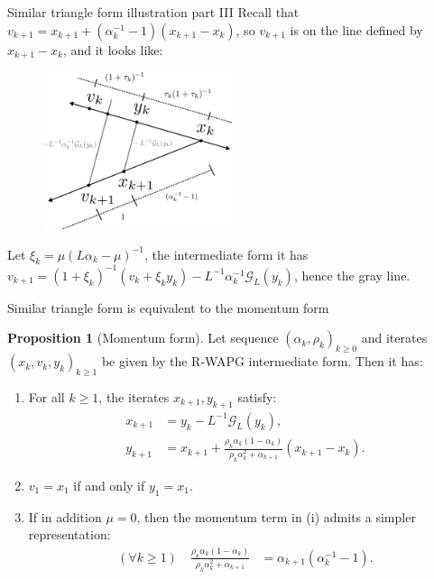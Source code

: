 \documentclass[11pt]{beamer}
\theoremstyle{definition}
\newtheorem{proposition}{Proposition}[section]
\begin{document}
        \begin{frame}{Similar triangle form illustration part III}
            Recall that $v_{k + 1} = x_{k + 1} + (\alpha_k^{-1} - 1)(x_{k + 1} - x_k)$, so $v_{k + 1}$ is on the line defined by $x_{k + 1} - x_k$, and it looks like: 
            \begin{tcolorbox}
                \begin{figure}
                    \includegraphics[width=15em]{assets/st_part3.png}
                \end{figure}
            \end{tcolorbox}
            Let $\xi_k = \mu(L\alpha_k - \mu)^{-1}$, the intermediate form it has $v_{k+1} = (1 + \xi_k)^{-1}(v_k + \xi_k y_k) - L^{-1}\alpha_k^{-1} \mathcal G_L(y_k)$, hence the gray line. 
        \end{frame}
        \begin{frame}{Similar triangle form is equivalent to the momentum form}
            \begin{proposition}[Momentum form]\label{prop:r-wapg-momentum-repr}
                Let sequence $(\alpha_k, \rho_k)_{k \ge 0}$ and iterates $(x_k, v_k, y_k)_{k\ge 1}$ be given by the R-WAPG intermediate form.
                Then it has:
                \begin{enumerate}
                    \item[(i)] For all $k \ge 1$, the iterates $x_{k + 1}, y_{k + 1}$ satisfy:
                    \begin{align*}
                        x_{k + 1} &= y_k - L^{-1}\mathcal G_L (y_k),
                        \\
                        y_{k + 1} &=
                        x_{k + 1} +
                        \frac{\rho_k\alpha_k(1 - \alpha_k)}
                        {\rho_k\alpha_k^2 + \alpha_{k + 1}}(x_{k + 1} - x_k).
                    \end{align*}
                    \item[(ii)] $v_1 = x_1$ if and only if $y_1 = x_1$.
                    \item[(iii)] If in addition $\mu = 0$, then the momentum term in (i) admits a simpler representation:
                    \begin{align*}
                        (\forall k \ge 1) \quad
                        \frac{\rho_k\alpha_k(1 - \alpha_k)}{\rho_k\alpha_k^2 + \alpha_{k + 1}}
                        & = \alpha_{k + 1}(\alpha_k^{-1} - 1).
                    \end{align*}
                \end{enumerate}
            \end{proposition}
        \end{frame}
\end{document}
